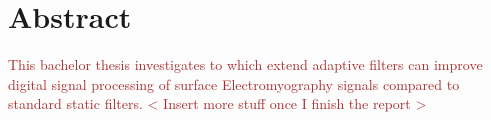 \chapter*{Abstract}
\textcolor{brown}{
This bachelor thesis investigates to which extend adaptive filters can improve digital signal processing of surface Electromyography signals compared to standard static filters. < Insert more stuff once I finish the report > } \\
